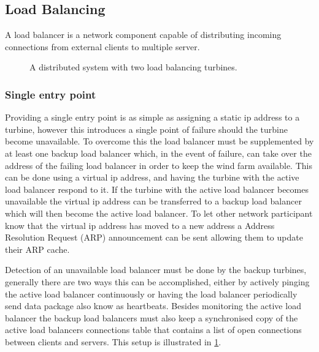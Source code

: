 \FloatBarrier
\subsection{Load Balancing}
A load balancer is a network component capable of distributing incoming connections from external clients to multiple server.

\begin{figure}
	\centering	
	\scalebox{0.7}{}
	\caption[Distributed system with two load balancing turbines]{
		\label{fig:loadBalancingSetup2Balancers} 
		\footnotesize{%
			A distributed system with two load balancing turbines.
		}
	}
\end{figure}


\subsubsection{Single entry point}
Providing a single entry point is as simple as assigning a static ip address to a turbine, however this introduces a single point of failure should the turbine become unavailable.
To overcome this the load balancer must be supplemented by at least one backup load balancer which, in the event of failure, can take over the address of the failing load balancer in order to keep the wind farm available.
This can be done using a virtual ip address, and having the turbine with the active load balancer respond to it.
If the turbine with the active load balancer becomes unavailable the virtual ip address can be transferred to a backup load balancer which will then become the active load balancer. To let other network participant know that the virtual ip address has moved to a new address a Address Resolution Request (ARP) announcement can be sent allowing them to update their ARP cache.

Detection of an unavailable load balancer must be done by the backup turbines, generally there are two ways this can be accomplished, either by actively pinging the active load balancer continuously or having the load balancer periodically send data package also know as heartbeats.
Besides monitoring the active load balancer the backup load balancers must also keep a synchronised copy of the active load balancers connections table that contains a list of open connections between clients and servers.
This setup is illustrated in \cref{fig:loadBalancingSetup2Balancers}.


